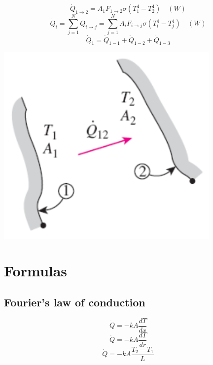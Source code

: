 \documentclass[11pt]{article}
\begin{document}
\[\dot{Q}_{1 \rightarrow 2} = A_1 F_{1 \rightarrow 2} \sigma (T_1^4 - T_2^4) \quad (\unit{W})\]
\[\dot{Q}_i = \sum_{j=1}^N \dot{Q}_{i \rightarrow j} = \sum_{j=1}^N A_i F_{i \rightarrow j} \sigma (T_i^4 - T_j^4) \quad (\unit{W}) \]
\[\dot{Q}_1 = \dot{Q}_{1-1} + \dot{Q}_{1-2} + \dot{Q}_{1-3}\]

\begin{center}
\includegraphics[width=.9\linewidth]{./images/radiation-exchange-within-enclosure-with-n-surfaces-diagram.png}
\end{center}

 \newpage

\section{Formulas}
\label{sec:org57b4dfd}

\subsection{Fourier's law of conduction}
\label{sec:orgaecbf64}
\[\dot{Q} = -kA \frac{dT}{dx}\]
\[\dot{Q} = -kA \frac{dT}{dr}\]
\[\dot{Q} = -kA \frac{T_2 - T_1}{L}\]
\end{document}
